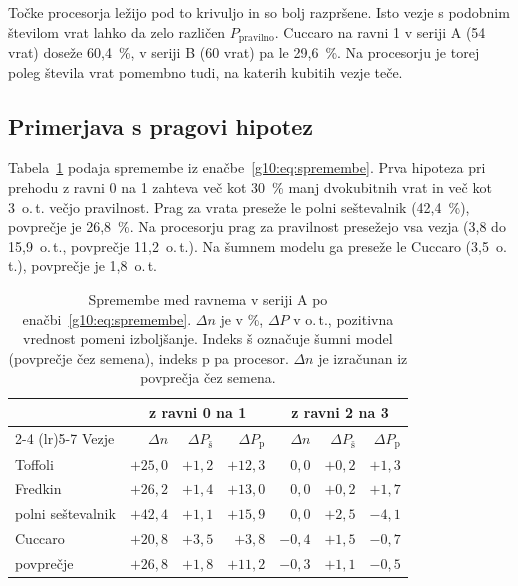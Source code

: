 \documentclass[graybox, envcountchap]{svmult}
\begin{document}
Točke procesorja ležijo pod to krivuljo in so bolj razpršene.
Isto vezje s podobnim številom vrat
lahko da zelo različen $P_\text{pravilno}$.
Cuccaro na ravni 1 v seriji A (54 vrat)
doseže 60,4~\%,
v seriji B (60 vrat) pa le 29,6~\%.
Na procesorju je torej poleg števila vrat pomembno tudi,
na katerih kubitih vezje teče.


\subsection{Primerjava s pragovi hipotez}
\label{g10:sec:rez_hipoteze}

Tabela~\ref{g10:tab:spremembe} podaja spremembe
iz enačbe~\eqref{g10:eq:spremembe}.
Prva hipoteza pri prehodu z ravni 0 na 1 zahteva
več kot 30~\% manj dvokubitnih vrat
in več kot 3~o.\,t. večjo pravilnost.
Prag za vrata preseže le polni seštevalnik (42,4~\%),
povprečje je 26,8~\%.
Na procesorju prag za pravilnost presežejo vsa vezja
(3,8 do 15,9~o.\,t., povprečje 11,2~o.\,t.).
Na šumnem modelu ga preseže le Cuccaro (3,5~o.\,t.),
povprečje je 1,8~o.\,t.

\begin{table}[htbp]
\caption{Spremembe med ravnema v seriji A
po enačbi~\eqref{g10:eq:spremembe}.
$\Delta n$ je v \%, $\Delta P$ v o.\,t.,
pozitivna vrednost pomeni izboljšanje.
Indeks š označuje šumni model (povprečje čez semena),
indeks p pa procesor.
$\Delta n$ je izračunan iz povprečja čez semena.}
\label{g10:tab:spremembe}
\centering
\small
\setlength{\tabcolsep}{4pt}
\begin{tabular}{lrrrrrr}
\toprule
 & \multicolumn{3}{c}{z ravni 0 na 1} & \multicolumn{3}{c}{z ravni 2 na 3} \\
\cmidrule(lr){2-4} \cmidrule(lr){5-7}
Vezje & $\Delta n$ & $\Delta P_\text{š}$ & $\Delta P_\text{p}$ & $\Delta n$ & $\Delta P_\text{š}$ & $\Delta P_\text{p}$ \\
\midrule
Toffoli & $+25{,}0$ & $+1{,}2$ & $+12{,}3$ & $0{,}0$ & $+0{,}2$ & $+1{,}3$ \\
Fredkin & $+26{,}2$ & $+1{,}4$ & $+13{,}0$ & $0{,}0$ & $+0{,}2$ & $+1{,}7$ \\
polni seštevalnik & $+42{,}4$ & $+1{,}1$ & $+15{,}9$ & $0{,}0$ & $+2{,}5$ & $-4{,}1$ \\
Cuccaro & $+20{,}8$ & $+3{,}5$ & $+3{,}8$ & $-0{,}4$ & $+1{,}5$ & $-0{,}7$ \\
\midrule
povprečje & $+26{,}8$ & $+1{,}8$ & $+11{,}2$ & $-0{,}3$ & $+1{,}1$ & $-0{,}5$ \\
\bottomrule
\end{tabular}
\end{table}
\end{document}
